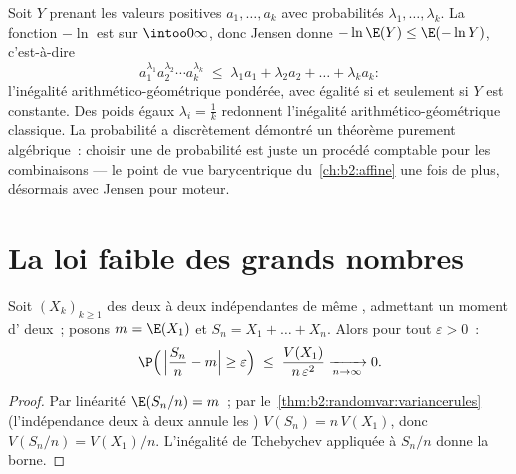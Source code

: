 \begin{example}\label{ex:b2:randomvar:amgm}
Soit $Y$ prenant les valeurs positives $a_1, \dots, a_k$ avec
probabilités $\lambda_1, \dots, \lambda_k$. La fonction
$-\ln$ est  sur $\intoo0\infty$, donc Jensen donne
$-\ln\E(Y) \leq \E(-\ln Y)$, c'est-à-dire
\[
a_1^{\lambda_1}a_2^{\lambda_2}\cdots a_k^{\lambda_k}
\;\leq\; \lambda_1a_1 + \lambda_2a_2 + \dots + \lambda_ka_k :
\]
l'inégalité arithmético-géométrique pondérée, avec égalité
si et seulement si $Y$ est constante. Des poids égaux $\lambda_i = \frac1k$
redonnent l'inégalité arithmético-géométrique classique. La probabilité a discrètement démontré
un théorème purement algébrique~: choisir une  de probabilité est
juste un procédé comptable pour les combinaisons  --- le
point de vue barycentrique du~\cref{ch:b2:affine} une fois de plus, désormais
avec Jensen pour moteur.
\end{example}

\section{La loi faible des grands nombres}

\begin{theorem}\label{thm:b2:randomvar:lln}
Soit $(X_k)_{k \geq 1}$ des  deux à deux indépendantes
de même , admettant un moment d' deux~; posons $m = \E(X_1)$
et $S_n = X_1 + \dots + X_n$. Alors pour tout $\varepsilon > 0$~:
\[
\P\Bigl(\,\Bigl|\frac{S_n}{n} - m\Bigr| \geq \varepsilon\Bigr)
\;\leq\; \frac{V(X_1)}{n\,\varepsilon^2}
\xrightarrow[n \to \infty]{} 0 .
\]
\end{theorem}

\begin{proof}
Par linéarité $\E(S_n/n) = m$~; par
le~\cref{thm:b2:randomvar:variancerules} (l'indépendance deux à deux
annule les ) $V(S_n) = n\,V(X_1)$, donc $V(S_n/n) =
V(X_1)/n$. L'inégalité de Tchebychev appliquée à $S_n/n$ donne la
borne.
\end{proof}


